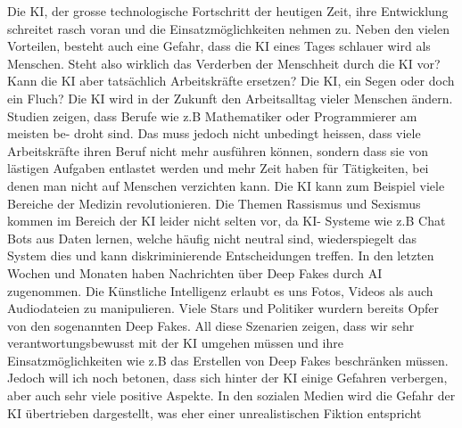 Die KI, der grosse technologische Fortschritt der heutigen Zeit, ihre Entwicklung schreitet rasch
voran und die Einsatzmöglichkeiten nehmen zu. Neben den vielen Vorteilen, besteht auch eine
Gefahr, dass die KI eines Tages schlauer wird als Menschen. Steht also wirklich das Verderben
der Menschheit durch die KI vor? Kann die KI aber tatsächlich Arbeitskräfte ersetzen? Die KI,
ein Segen oder doch ein Fluch? Die KI wird in der Zukunft den Arbeitsalltag vieler Menschen
ändern. Studien zeigen, dass Berufe wie z.B Mathematiker oder Programmierer am meisten be-
droht sind. Das muss jedoch nicht unbedingt heissen, dass viele Arbeitskräfte ihren Beruf nicht
mehr ausführen können, sondern dass sie von lästigen Aufgaben entlastet werden und mehr Zeit
haben für Tätigkeiten, bei denen man nicht auf Menschen verzichten kann. Die KI kann zum Beispiel viele Bereiche der Medizin revolutionieren. Die Themen Rassismus und Sexismus kommen
im Bereich der KI leider nicht selten vor, da KI- Systeme wie z.B Chat Bots aus Daten lernen,
welche häufig nicht neutral sind, wiederspiegelt das System dies und kann diskriminierende Entscheidungen treffen. In den letzten Wochen und Monaten haben Nachrichten über Deep Fakes
durch AI zugenommen. Die Künstliche Intelligenz erlaubt es uns Fotos, Videos als auch Audiodateien zu manipulieren. Viele Stars und Politiker wurdern bereits Opfer von den sogenannten
Deep Fakes. All diese Szenarien zeigen, dass wir sehr verantwortungsbewusst mit der KI umgehen müssen und ihre Einsatzmöglichkeiten wie z.B das Erstellen von Deep Fakes beschränken
müssen. Jedoch will ich noch betonen, dass sich hinter der KI einige Gefahren verbergen, aber
auch sehr viele positive Aspekte. In den sozialen Medien wird die Gefahr der KI übertrieben
dargestellt, was eher einer unrealistischen Fiktion entspricht

